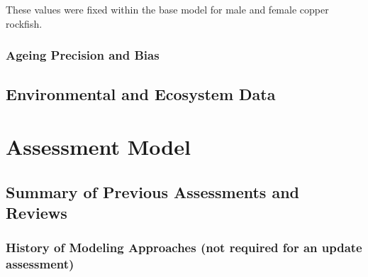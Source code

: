 \documentclass[11pt,
  english,
  a4paper,
]{article}
\begin{document}

These values were fixed within the base model for male and female copper rockfish.

\leavevmode\tagmcend\tagstructend\par


\hypertarget{ageing-precision-and-bias}{%
\subsubsection{Ageing Precision and Bias}\label{ageing-precision-and-bias}}

\leavevmode\tagmcend\tagstructend


\hypertarget{environmental-and-ecosystem-data}{%
\subsection{Environmental and Ecosystem Data}\label{environmental-and-ecosystem-data}}

\leavevmode\tagmcend\tagstructend


\hypertarget{assessment-model}{%
\section{Assessment Model}\label{assessment-model}}

\leavevmode\tagmcend\tagstructend


\hypertarget{summary-of-previous-assessments-and-reviews}{%
\subsection{Summary of Previous Assessments and Reviews}\label{summary-of-previous-assessments-and-reviews}}

\leavevmode\tagmcend\tagstructend


\hypertarget{history-of-modeling-approaches-not-required-for-an-update-assessment}{%
\subsubsection{History of Modeling Approaches (not required for an update assessment)}\label{history-of-modeling-approaches-not-required-for-an-update-assessment}}
\end{document}
